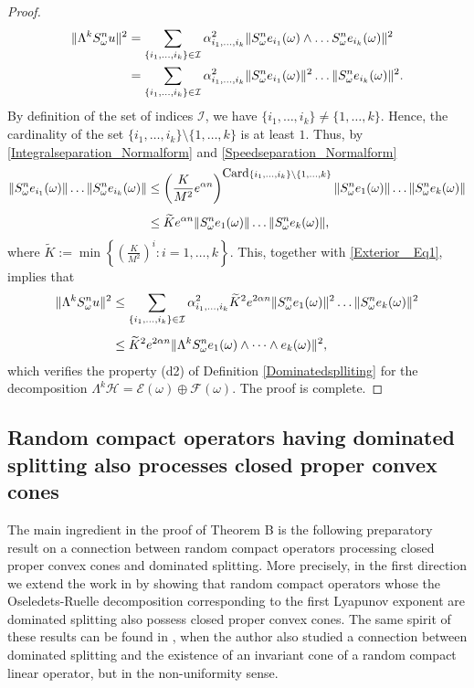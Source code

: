 \documentclass[pdflatex,sn-mathphys-num]{sn-jnl}%
\theoremstyle{thmstyleone}%
\theoremstyle{thmstyletwo}%
\theoremstyle{thmstylethree}%
\newcommand{\cH}{\mathcal{H}}
\newcommand{\cF}{\mathcal{F}}
\newcommand{\cE}{\mathcal{E}}
\numberwithin{equation}{section}
\begin{document}
\begin{proof}
\begin{align}
\|\Lambda^k S^n_{\omega} u\|^2
& =
\sum_{\{i_1,\dots,i_k\}\in\mathcal I} \alpha_{i_1,\dots,i_k}^2\|S^n_{\omega} e_{i_1}(\omega)\wedge\dots S^n_{\omega} e_{i_k}(\omega)\|^2\notag\\
& = 
\sum_{\{i_1,\dots,i_k\}\in\mathcal I} \alpha_{i_1,\dots,i_k}^2\|S^n_{\omega} e_{i_1}(\omega)\|^2 \dots \|S^n_{\omega} e_{i_k}(\omega)\|^2\label{Exterior
_Eq1}.
\end{align}
By definition of the set of indices $\mathcal I$, we have $\{i_1,\dots,i_k\}\not=\{1,\dots,k\}$. Hence, the cardinality of the set $\{i_1,\dots,i_k\}\setminus\{1,\dots,k\}$ is at least $1$. Thus, by \eqref{Integralseparation_Normalform} and \eqref{Speedseparation_Normalform}
\begin{align}
\|S^n_{\omega} e_{i_1}(\omega)\| \dots \|S^n_{\omega} e_{i_k}(\omega)\|
& \leq \left(\frac{K}{M^2} e^{\alpha n}\right)^{\mbox{Card} \{i_1,\dots,i_k\}\setminus\{1,\dots,k\}} \|S^n_{\omega}e_1(\omega)\|\dots \|S^n_{\omega}e_k(\omega)\|\notag\\[1ex]
& \leq \widetilde K e^{\alpha n}\|S^n_{\omega}e_1(\omega)\|\dots \|S^n_{\omega}e_k(\omega)\|\notag, 
\end{align}
where $\widetilde K:=\min\left\{\left(\frac{K}{M^2}\right)^i: i=1,\dots,k\right\}$. This, together with \eqref{Exterior
_Eq1}, implies that 
\begin{align}
\|\Lambda^k S^n_{\omega} u\|^2
& \leq 
\sum_{\{i_1,\dots,i_k\}\in\mathcal I} \alpha_{i_1,\dots,i_k}^2 {\widetilde K}^2 e^{2\alpha n} \|S^n_{\omega}e_1(\omega)\|^2\dots \|S^n_{\omega}e_k(\omega)\|^2\notag\\[1ex]
& \leq 
{\widetilde K}^2 e^{2\alpha n} \|\Lambda^kS_{\omega}^n e_1(\omega)\wedge \dots \wedge e_k(\omega)\|^2,\notag
\end{align}
which verifies the property (d2) of Definition \ref{Dominatedsplliting} for the decomposition $\Lambda^k\cH=\cE(\omega) \oplus  \cF(\omega)$. The proof is complete.
\end{proof}
%
%
%
\subsection{Random compact operators having dominated splitting also processes closed proper convex cones}
%
The main ingredient in the proof of Theorem B is the following preparatory result on a connection between random compact operators processing closed proper convex cones and dominated splitting. More precisely, in the first direction we extend the work in \cite{Doan17} by showing that random compact operators whose the Oseledets-Ruelle decomposition corresponding to the first Lyapunov exponent are dominated splitting also possess closed proper convex cones. The same spirit of these results can be found in \cite{Lian}, when the author also studied a connection between dominated splitting and the existence of an invariant cone of a random compact linear operator, but in the non-uniformity sense. 
\end{document}
